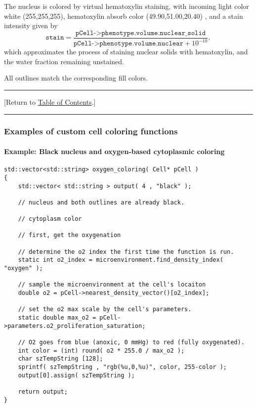\documentclass[12pt]{article}
\newcommand{\beq}{\begin{equation}}
\newcommand{\eeq}{\end{equation}}
\newcommand{\red}[1]{\textcolor{red}{#1}}
\newcommand{\TOClink}{\begin{center}\hrule\vskip-10pt\phantom{.}\hfill[Return to \hyperlink{TOC}{Table of Contents}.]\hfill\phantom{.}\vskip3pt\hrule\end{center}}
\begin{document}
\begin{enumerate}
The nucleus is colored by virtual hematoxylin staining, with incoming 
light color white (255,255,255), hematoxylin absorb color 
(49.90,51.00,20.40) \cite{ref:H_and_E}, 
and a stain intensity given by 
%
\beq
\texttt{stain} = 
 \frac{ \texttt{pCell->phenotype.volume.nuclear\_solid} }
 { \texttt{pCell->phenotype.volume.nuclear} + 10^{-10} }, 
\eeq
%
which approximates the process of staining nuclear solids with hematoxylin, and 
the water fraction remaining unstained.

All outlines match the corresponding fill colors. 



\end{enumerate}

\TOClink 

\subsubsection{Examples of custom cell coloring functions}

\paragraph{Example: Black nucleus and oxygen-based cytoplasmic coloring}  
\begin{verbatim}
std::vector<std::string> oxygen_coloring( Cell* pCell )
{
    std::vector< std::string > output( 4 , "black" ); 
	
    // nucleus and both outlines are already black. 

    // cytoplasm color 

    // first, get the oxygenation 
	
    // determine the o2 index the first time the function is run. 
    static int o2_index = microenvironment.find_density_index( "oxygen" ); 

    // sample the microenvironment at the cell's locaiton 
    double o2 = pCell->nearest_density_vector()[o2_index]; 

    // set the o2 max scale by the cell's parameters. 
    static double max_o2 = pCell->parameters.o2_proliferation_saturation;  

    // O2 goes from blue (anoxic, 0 mmHg) to red (fully oxygenated). 
    int color = (int) round( o2 * 255.0 / max_o2 ); 
    char szTempString [128]; 
    sprintf( szTempString , "rgb(%u,0,%u)", color, 255-color ); 
    output[0].assign( szTempString ); 

    return output; 
}
\end{verbatim}
\end{document}
